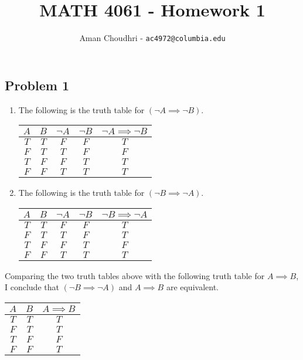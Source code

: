 \documentclass[11pt, oneside]{article}
\title{MATH 4061 - Homework 1}
\author{Aman Choudhri - \texttt{ac4972@columbia.edu}}
\begin{document}
\maketitle
\subsection*{Problem 1}
\begin{enumerate}
    \item The following is the truth table for $(\neg A \implies \neg B)$.
    \begin{center}
        \begin{tabular}{|c|c|c|c|c|}
            \hline
            $A$ & $B$ & $\neg A$ & $\neg B$ & $\neg A \implies \neg B$ \\
            \hline
            $T$ & $T$ & $F$ & $F$ & $T$ \\
            $F$ & $T$ & $T$ & $F$ & $F$ \\
            $T$ & $F$ & $F$ & $T$ & $T$ \\
            $F$ & $F$ & $T$ & $T$ & $T$ \\
            \hline
        \end{tabular}
    \end{center}
    \item The following is the truth table for $(\neg B \implies \neg A)$.
    \begin{center}
        \begin{tabular}{|c|c|c|c|c|}
            \hline
            $A$ & $B$ & $\neg A$ & $\neg B$ & $\neg B \implies \neg A$ \\
            \hline
            $T$ & $T$ & $F$ & $F$ & $T$ \\
            $F$ & $T$ & $T$ & $F$ & $T$ \\
            $T$ & $F$ & $F$ & $T$ & $F$ \\
            $F$ & $F$ & $T$ & $T$ & $T$ \\
            \hline
        \end{tabular}
    \end{center}
\end{enumerate}
Comparing the two truth tables above with the following truth table for $A \implies B$,
I conclude that $(\neg B \implies \neg A)$ and $A \implies B$ are equivalent.

\begin{center}
    \begin{tabular}{|c|c|c|}
        \hline
        $A$ & $B$ & $A \implies B$ \\
        \hline
        $T$ & $T$ & $T$ \\
        $F$ & $T$ & $T$ \\
        $T$ & $F$ & $F$ \\
        $F$ & $F$ & $T$ \\
        \hline
    \end{tabular}
\end{center}
\end{document}
